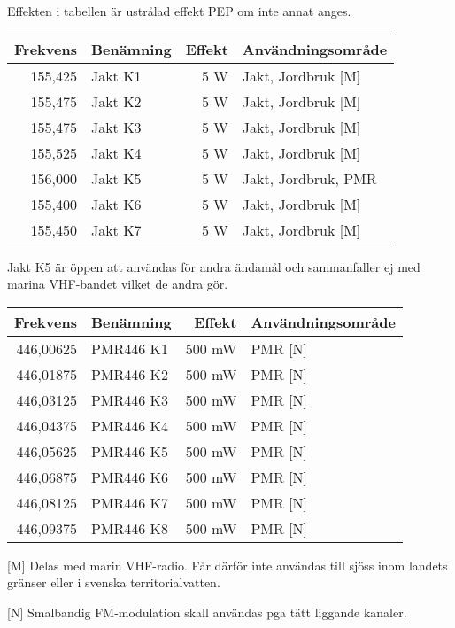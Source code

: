 \documentclass[12pt,swedish,a4paper]{article}
\begin{document}
Effekten i tabellen är ustrålad effekt PEP om inte annat anges.\\

\begin{tabular}{rlrl}
	Frekvens & Benämning & Effekt & Användningsområde   \\ \hline
	 155,425 & Jakt K1   &    5 W & Jakt, Jordbruk [M]  \\
	 155,475 & Jakt K2   &    5 W & Jakt, Jordbruk [M]  \\
	 155,475 & Jakt K3   &    5 W & Jakt, Jordbruk [M]  \\
	 155,525 & Jakt K4   &    5 W & Jakt, Jordbruk [M]  \\
	 156,000 & Jakt K5   &    5 W & Jakt, Jordbruk, PMR \\
	 155,400 & Jakt K6   &    5 W & Jakt, Jordbruk [M]  \\
	 155,450 & Jakt K7   &    5 W & Jakt, Jordbruk [M]
\end{tabular}

Jakt K5 är öppen att användas för andra ändamål och sammanfaller ej med marina VHF-bandet vilket de andra gör.

\begin{tabular}{rlrl}
	 Frekvens & Benämning & Effekt & Användningsområde \\ \hline
	446,00625 & PMR446 K1 & 500 mW & PMR [N]              \\
	446,01875 & PMR446 K2 & 500 mW & PMR [N]              \\
	446,03125 & PMR446 K3 & 500 mW & PMR [N]              \\
	446,04375 & PMR446 K4 & 500 mW & PMR [N]              \\
	446,05625 & PMR446 K5 & 500 mW & PMR [N]              \\
	446,06875 & PMR446 K6 & 500 mW & PMR [N]              \\
	446,08125 & PMR446 K7 & 500 mW & PMR [N]              \\
	446,09375 & PMR446 K8 & 500 mW & PMR [N]
\end{tabular}

[M] Delas med marin VHF-radio. Får därför inte användas till sjöss inom landets gränser eller i svenska territorialvatten.

[N] Smalbandig FM-modulation skall användas pga tätt liggande kanaler.
\end{document}
